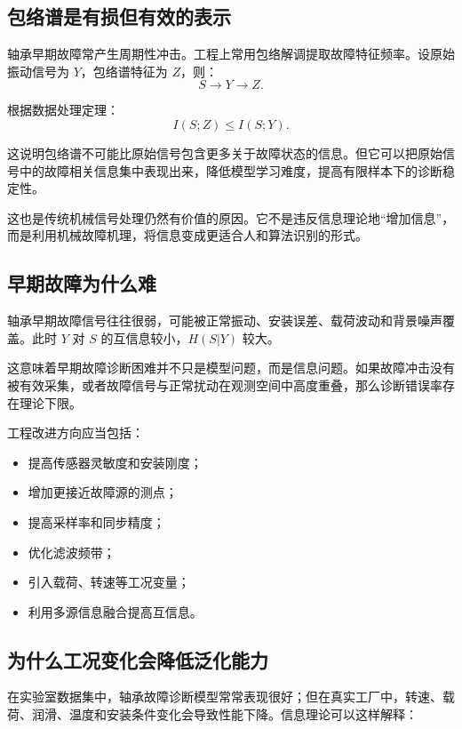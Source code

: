 \documentclass[UTF8,a4paper,12pt]{ctexart}
\begin{document}
\subsection{包络谱是有损但有效的表示}

轴承早期故障常产生周期性冲击。工程上常用包络解调提取故障特征频率。设原始振动信号为 $Y$，包络谱特征为 $Z$，则：
\begin{equation}
S \rightarrow Y \rightarrow Z.
\end{equation}

根据数据处理定理：
\begin{equation}
I(S;Z)\le I(S;Y).
\end{equation}

这说明包络谱不可能比原始信号包含更多关于故障状态的信息。但它可以把原始信号中的故障相关信息集中表现出来，降低模型学习难度，提高有限样本下的诊断稳定性。

这也是传统机械信号处理仍然有价值的原因。它不是违反信息理论地“增加信息”，而是利用机械故障机理，将信息变成更适合人和算法识别的形式。

\subsection{早期故障为什么难}

轴承早期故障信号往往很弱，可能被正常振动、安装误差、载荷波动和背景噪声覆盖。此时 $Y$ 对 $S$ 的互信息较小，$H(S|Y)$ 较大。

这意味着早期故障诊断困难并不只是模型问题，而是信息问题。如果故障冲击没有被有效采集，或者故障信号与正常扰动在观测空间中高度重叠，那么诊断错误率存在理论下限。

工程改进方向应当包括：
\begin{itemize}
  \item 提高传感器灵敏度和安装刚度；
  \item 增加更接近故障源的测点；
  \item 提高采样率和同步精度；
  \item 优化滤波频带；
  \item 引入载荷、转速等工况变量；
  \item 利用多源信息融合提高互信息。
\end{itemize}

\subsection{为什么工况变化会降低泛化能力}

在实验室数据集中，轴承故障诊断模型常常表现很好；但在真实工厂中，转速、载荷、润滑、温度和安装条件变化会导致性能下降。信息理论可以这样解释：
\end{document}
